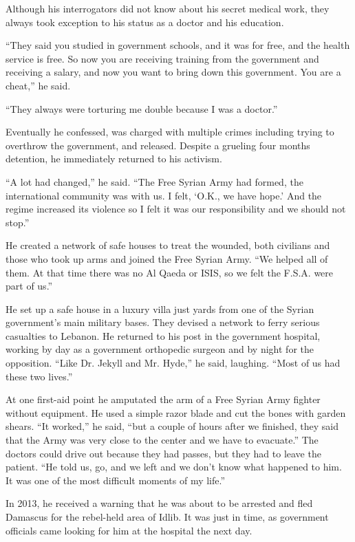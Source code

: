 Although his interrogators did not know about his secret medical work,
they always took exception to his status as a doctor and his education.

``They said you studied in government schools, and it was for free, and
the health service is free. So now you are receiving training from the
government and receiving a salary, and now you want to bring down this
government. You are a cheat,'' he said.

``They always were torturing me double because I was a doctor.''

Eventually he confessed, was charged with multiple crimes including
trying to overthrow the government, and released. Despite a grueling
four months detention, he immediately returned to his activism.

``A lot had changed,'' he said. ``The Free Syrian Army had formed, the
international community was with us. I felt, `O.K., we have hope.' And
the regime increased its violence so I felt it was our responsibility
and we should not stop.''

He created a network of safe houses to treat the wounded, both civilians
and those who took up arms and joined the Free Syrian Army. ``We helped
all of them. At that time there was no Al Qaeda or ISIS, so we felt the
F.S.A. were part of us.''

He set up a safe house in a luxury villa just yards from one of the
Syrian government's main military bases. They devised a network to ferry
serious casualties to Lebanon. He returned to his post in the government
hospital, working by day as a government orthopedic surgeon and by night
for the opposition. ``Like Dr. Jekyll and Mr. Hyde,'' he said, laughing.
``Most of us had these two lives.''

At one first-aid point he amputated the arm of a Free Syrian Army
fighter without equipment. He used a simple razor blade and cut the
bones with garden shears. ``It worked,'' he said, ``but a couple of
hours after we finished, they said that the Army was very close to the
center and we have to evacuate.'' The doctors could drive out because
they had passes, but they had to leave the patient. ``He told us, go,
and we left and we don't know what happened to him. It was one of the
most difficult moments of my life.''

In 2013, he received a warning that he was about to be arrested and fled
Damascus for the rebel-held area of Idlib. It was just in time, as
government officials came looking for him at the hospital the next day.

